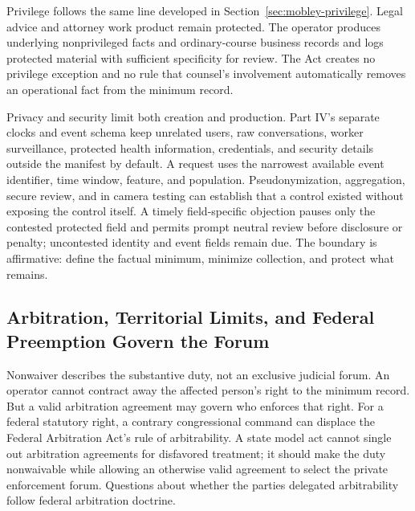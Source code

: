 Privilege follows the same line developed in Section~\ref{sec:mobley-privilege}. Legal advice and attorney work product remain protected. The operator produces underlying nonprivileged facts and ordinary-course business records and logs protected material with sufficient specificity for review. The Act creates no privilege exception and no rule that counsel's involvement automatically removes an operational fact from the minimum record.

Privacy and security limit both creation and production. Part IV's separate clocks and event schema keep unrelated users, raw conversations, worker surveillance, protected health information, credentials, and security details outside the manifest by default. A request uses the narrowest available event identifier, time window, feature, and population. Pseudonymization, aggregation, secure review, and in camera testing can establish that a control existed without exposing the control itself. A timely field-specific objection pauses only the contested protected field and permits prompt neutral review before disclosure or penalty; uncontested identity and event fields remain due. The boundary is affirmative: define the factual minimum, minimize collection, and protect what remains.

\subsection{Arbitration, Territorial Limits, and Federal Preemption Govern the Forum}

Nonwaiver describes the substantive duty, not an exclusive judicial forum. An operator cannot contract away the affected person's right to the minimum record. But a valid arbitration agreement may govern who enforces that right. For a federal statutory right, a contrary congressional command can displace the Federal Arbitration Act's rule of arbitrability. A state model act cannot single out arbitration agreements for disfavored treatment; it should make the duty nonwaivable while allowing an otherwise valid agreement to select the private enforcement forum. Questions about whether the parties delegated arbitrability follow federal arbitration doctrine.

